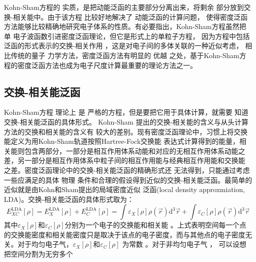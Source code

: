 Kohn-Sham方程的%
实质，是把动能泛函的主要部分分离出来，将剩余%
部分放到交换-相关能中。由于该方程%
{比较好地}解决了%
动能泛函的{计算}问题，%
使得密度泛函方法能够比较精确地研究电子体系的性质。有必要指出，Kohn-Sham方程虽然把单%
电子波函数引进密度泛函理论，但它是{\heiti 形式上的单粒子方程}，%
因为方程中包括泛函的形式表示的交换-相关作用%
，这是对电子间的多体关联的一种近似考虑，%
{相比}传统的量子%
{力}学方法，密度泛函方法有明显的%
优越%
{之处}，基于Kohn-Sham方程的密度泛函方法也成为电子尺度计算最重要的{理论}方法之一。

\subsection{交换-相关能泛函}
Kohn-Sham方程%
理论上%
是%
严格的方程，但是要把它用于具体计算，就需要%
{知道}交换-相关能泛函的具体形式。%
Kohn-Sham%
提出的交换-相关能的含义与从头计算方法的交换和相关能的含义有%
{较}大的差别{。现有}密度泛函理论中，习惯上将交换能定义为用Kohn-Sham轨道按照Hartree-Fock交换能%
{表达}式计算得到的能量，相关能则包含两部分，一部分是相互作用体系动能和对应的无相互作用体系动能{之}差，另一部分是相互作用体系中粒子间的相互作用能与经典相互作用{能}和交换能%
{之}差。密度泛函{理论}中的交换-相关能泛函的精确形式还%
{无法}得到，只能通过{考虑}一些{应满足的}具体%
物理%
{条件}和合理的假设得到近似的交换-相关能泛函。最简单的近似就是由Kohn和Sham提出的局域密度近似%
{泛函}(local density approxmiation, LDA)\cite{PR140-A1133_1965}{。}交换-相关能{泛函}的具体形式取为：
\begin{equation}
  \label{eq:dft-5}
  E_{XC}^{\mathrm{LDA}}[\rho]=E_X^{\mathrm{LDA}}[\rho]+E_C^{\mathrm{LDA}}[\rho]=\int\varepsilon_X[\rho]\rho(\vec{r}) \textrm{d}^3\vec{r}+\int\varepsilon_C[\rho]\rho(\vec{r}) \textrm{d}^3\vec{r}
\end{equation}
其中$\varepsilon_X[\rho]$和$\varepsilon_C[\rho]$分别为{一个电子的}交换能和相关能%
。上式表明空间每一个点的交换能密度和相关能密度只是取决于该点的电子密度，而与其他点的电子密度无关。对{于均匀电子气，}$\varepsilon_X[\rho]$和$\varepsilon_C[\rho]$%
{为常数%
。}对于非均匀电子气%
，%
{可以设想}把空间分割为无穷多个%
